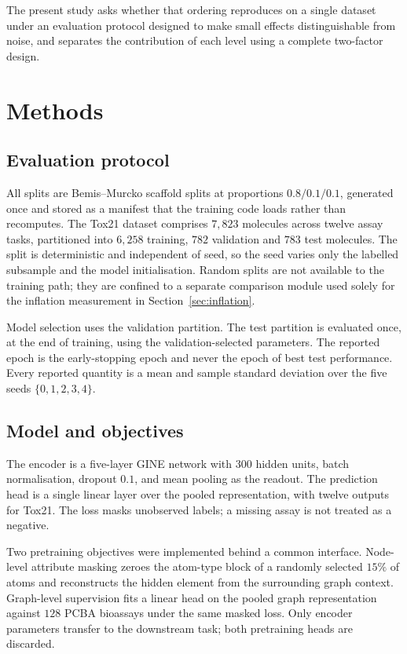 \documentclass[11pt,a4paper]{article}
\begin{document}
The present study asks whether that ordering reproduces on a single dataset
under an evaluation protocol designed to make small effects distinguishable from
noise, and separates the contribution of each level using a complete two-factor
design.

\section{Methods}

\subsection{Evaluation protocol}

All splits are Bemis--Murcko scaffold splits at proportions $0.8/0.1/0.1$,
generated once and stored as a manifest that the training code loads rather than
recomputes. The Tox21 dataset comprises $7{,}823$ molecules across twelve assay
tasks, partitioned into $6{,}258$ training, $782$ validation and $783$ test
molecules. The split is deterministic and independent of seed, so the seed
varies only the labelled subsample and the model initialisation. Random splits
are not available to the training path; they are confined to a separate
comparison module used solely for the inflation measurement in
Section~\ref{sec:inflation}.

Model selection uses the validation partition. The test partition is evaluated
once, at the end of training, using the validation-selected parameters. The
reported epoch is the early-stopping epoch and never the epoch of best test
performance. Every reported quantity is a mean and sample standard deviation
over the five seeds $\{0,1,2,3,4\}$.

\subsection{Model and objectives}

The encoder is a five-layer GINE network with $300$ hidden units, batch
normalisation, dropout $0.1$, and mean pooling as the readout. The prediction
head is a single linear layer over the pooled representation, with twelve
outputs for Tox21. The loss masks unobserved labels; a missing assay is not
treated as a negative.

Two pretraining objectives were implemented behind a common interface.
Node-level attribute masking zeroes the atom-type block of a randomly selected
$15\%$ of atoms and reconstructs the hidden element from the surrounding graph
context. Graph-level supervision fits a linear head on the pooled graph
representation against $128$ PCBA bioassays under the same masked loss. Only
encoder parameters transfer to the downstream task; both pretraining heads are
discarded.
\end{document}

